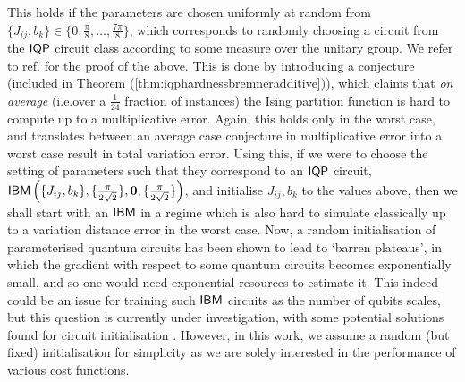This holds if the parameters are chosen uniformly at random from $\{J_{ij}, b_k\} \in\{0,\frac{\pi}{8}, \dots, \frac{7\pi}{8}\}$, which corresponds to randomly choosing a circuit from the $\operatorname{\textsf{IQP}}$ circuit class according to some measure over the unitary group. We refer to ref. for the proof of the above. This is done by introducing a conjecture (included in Theorem (\ref{thm:iqphardnessbremneradditive})), which claims that \textit{on average} (i.e.\@\@ over a $\frac{1}{24}$ fraction of instances) the Ising partition function is hard to compute up to a multiplicative error. Again, this holds only in the worst case, and translates between an average case conjecture in multiplicative error into a worst case result in total variation error. Using this, if we were to choose the setting of parameters such that they correspond to an $\operatorname{\textsf{IQP}}$ circuit, $\textsf{IBM}\left(\{J_{ij}, b_{k}\}, \{\frac{\pi}{2\sqrt{2}}\},  \mathbf{0},  \{\frac{\pi}{2\sqrt{2}}\}\right)$, and initialise $J_{ij}, b_k$ to the values above, then we shall start with an $\textsf{IBM}$ in a regime which is also hard to simulate classically up to a variation distance error in the worst case. Now, a random initialisation of parameterised quantum circuits has been shown to lead to `barren plateaus', in which the gradient with respect to some quantum circuits becomes exponentially small, and so one would need exponential resources to estimate it. This indeed could be an issue for training such $\textsf{IBM}$ circuits as the number of qubits scales, but this question is currently under investigation, with some potential solutions found for circuit initialisation . However, in this work, we assume a random (but fixed) initialisation for simplicity as we are solely interested in the performance of various cost functions.




